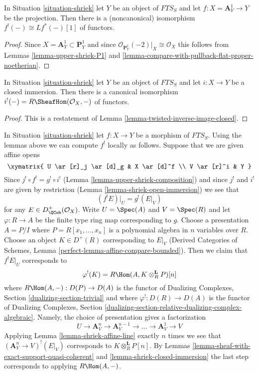 \begin{lemma}
\label{lemma-shriek-affine-line}
In Situation \ref{situation-shriek} let $Y$ be an object of $\textit{FTS}_S$
and let $f : X = \mathbf{A}^1_Y \to Y$ be
the projection. Then there is a (noncanonical) isomorphism
$f^!(-) \cong Lf^*(-) [1]$ of functors.
\end{lemma}

\begin{proof}
Since $X = \mathbf{A}^1_Y \subset \mathbf{P}^1_Y$
and since $\mathcal{O}_{\mathbf{P}^1_Y}(-2)|_X \cong \mathcal{O}_X$
this follows from Lemmas \ref{lemma-upper-shriek-P1} and
\ref{lemma-compare-with-pullback-flat-proper-noetherian}.
\end{proof}

\begin{lemma}
\label{lemma-shriek-closed-immersion}
In Situation \ref{situation-shriek} let $Y$ be an object of
$\textit{FTS}_S$ and let $i : X \to Y$ be a closed immersion.
Then there is a canonical isomorphism
$i^!(-) = R\SheafHom(\mathcal{O}_X, -)$ of functors.
\end{lemma}

\begin{proof}
This is a restatement of Lemma \ref{lemma-twisted-inverse-image-closed}.
\end{proof}

\begin{remark}
\label{remark-local-calculation-shriek}
In Situation \ref{situation-shriek} let $f : X \to Y$ be a morphism of
$\textit{FTS}_S$. Using the lemmas above we can compute
$f^!$ locally as follows. Suppose that we are given affine opens
$$
\xymatrix{
U \ar[r]_j \ar[d]_g & X \ar[d]^f \\
V \ar[r]^i & Y
}
$$
Since $j^! \circ f^! = g^! \circ i^!$
(Lemma \ref{lemma-upper-shriek-composition})
and since $j^!$ and $i^!$ are given by restriction
(Lemma \ref{lemma-shriek-open-immersion})
we see that
$$
(f^!E)|_U = g^!(E|_V)
$$
for any $E \in D^+_\QCoh(\mathcal{O}_X)$. Write
$U = \Spec(A)$ and $V = \Spec(R)$ and let $\varphi : R \to A$
be the finite type ring map corresponding to $g$.
Choose a presentation $A = P/I$ where $P = R[x_1, \ldots, x_n]$
is a polynomial algebra in $n$ variables over $R$. Choose an
object $K \in D^+(R)$ corresponding to $E|_V$
(Derived Categories of Schemes, Lemma
\ref{perfect-lemma-affine-compare-bounded}).
Then we claim that $f^!E|_U$ corresponds to
$$
\varphi^!(K) = R\Hom(A, K \otimes_R^\mathbf{L} P)[n]
$$
where $R\Hom(A, -) : D(P) \to D(A)$ is the functor of
Dualizing Complexes, Section \ref{dualizing-section-trivial}
and where $\varphi^! : D(R) \to D(A)$ is the functor of
Dualizing Complexes, Section
\ref{dualizing-section-relative-dualizing-complex-algebraic}.
Namely, the choice of presentation
gives a factorization
$$
U \rightarrow \mathbf{A}^n_V \to \mathbf{A}^{n - 1}_V \to \ldots \to
\mathbf{A}^1_V \to V
$$
Applying Lemma \ref{lemma-shriek-affine-line} exactly $n$ times we see that
$(\mathbf{A}^n_V \to V)^!(E|_V)$ corresponds to
$K \otimes_R^\mathbf{L} P[n]$. By Lemmas
\ref{lemma-sheaf-with-exact-support-quasi-coherent} and
\ref{lemma-shriek-closed-immersion} the last step corresponds to
applying $R\Hom(A, -)$.
\end{remark}

